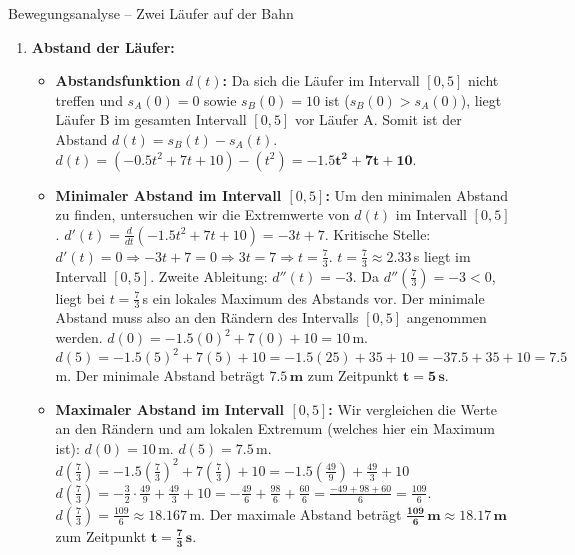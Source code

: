 \begin{loesungsumgebung}{Bewegungsanalyse – Zwei Läufer auf der Bahn}
\begin{enumerate}[label=(\alph*)]
    \item \textbf{Abstand der Läufer:}
    \begin{itemize}
        \item \textbf{Abstandsfunktion $d(t)$:}
        Da sich die Läufer im Intervall $[0,5]$ nicht treffen und $s_A(0)=0$ sowie $s_B(0)=10$ ist ($s_B(0) > s_A(0)$), liegt Läufer B im gesamten Intervall $[0,5]$ vor Läufer A.
        Somit ist der Abstand $d(t) = s_B(t) - s_A(t)$.
        $d(t) = (-0.5t^2 + 7t + 10) - (t^2) = \mathbf{-1.5t^2 + 7t + 10}$.

        \item \textbf{Minimaler Abstand im Intervall $[0,5]$:}
        Um den minimalen Abstand zu finden, untersuchen wir die Extremwerte von $d(t)$ im Intervall $[0,5]$.
        $d'(t) = \frac{d}{dt}(-1.5t^2 + 7t + 10) = -3t + 7$.
        Kritische Stelle: $d'(t)=0 \Rightarrow -3t + 7 = 0 \Rightarrow 3t=7 \Rightarrow t = \frac{7}{3}$.
        $t = \frac{7}{3} \approx 2.33\,$s liegt im Intervall $[0,5]$.
        Zweite Ableitung: $d''(t) = -3$.
        Da $d''(\frac{7}{3}) = -3 < 0$, liegt bei $t=\frac{7}{3}\,$s ein lokales Maximum des Abstands vor.
        Der minimale Abstand muss also an den Rändern des Intervalls $[0,5]$ angenommen werden.
        $d(0) = -1.5(0)^2 + 7(0) + 10 = 10\,$m.
        $d(5) = -1.5(5)^2 + 7(5) + 10 = -1.5(25) + 35 + 10 = -37.5 + 35 + 10 = 7.5\,$m.
        Der minimale Abstand beträgt $\mathbf{7.5\,m}$ zum Zeitpunkt $\mathbf{t=5\,s}$.

        \item \textbf{Maximaler Abstand im Intervall $[0,5]$:}
        Wir vergleichen die Werte an den Rändern und am lokalen Extremum (welches hier ein Maximum ist):
        $d(0) = 10\,$m.
        $d(5) = 7.5\,$m.
        $d(\frac{7}{3}) = -1.5\left(\frac{7}{3}\right)^2 + 7\left(\frac{7}{3}\right) + 10 = -1.5\left(\frac{49}{9}\right) + \frac{49}{3} + 10$
        $d(\frac{7}{3}) = -\frac{3}{2} \cdot \frac{49}{9} + \frac{49}{3} + 10 = -\frac{49}{6} + \frac{98}{6} + \frac{60}{6} = \frac{-49+98+60}{6} = \frac{109}{6}$.
        $d(\frac{7}{3}) = \frac{109}{6} \approx 18.167\,$m.
        Der maximale Abstand beträgt $\mathbf{\frac{109}{6}\,m \approx 18.17\,m}$ zum Zeitpunkt $\mathbf{t=\frac{7}{3}\,s}$.
    \end{itemize}
\end{enumerate}

\end{loesungsumgebung}


